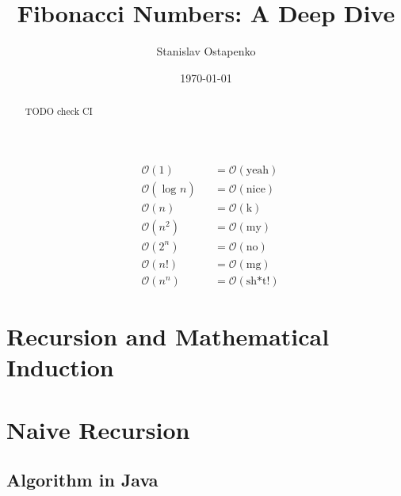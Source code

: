 \documentclass{article}
\begin{document}


\title{Fibonacci Numbers: A Deep Dive}
\author{Stanislav Ostapenko}
\date{\today}
\maketitle

\begin{abstract}
	TODO check CI
\end{abstract}

\clearpage

	\tableofcontents %

	\clearpage
	
	\lstlistoflistings %

\clearpage %

\clearpage

	\thispagestyle{empty}

	\vspace*{\fill}
	\begin{center}
		\Huge
		\begin{align*}
			&   \mathcal{O}(1) &&= \mathcal{O}(\text{yeah})\\
			&    \mathcal{O}(\log_{} n) &&= \mathcal{O}(\text{nice})\\
			&    \mathcal{O}(n) &&= \mathcal{O}(\text{k})\\
			&    \mathcal{O}(n^{2}) &&= \mathcal{O}(\text{my})\\
			&    \mathcal{O}(2^{n}) &&= \mathcal{O}(\text{no})\\
			&    \mathcal{O}(n!) &&= \mathcal{O}(\text{mg})\\
			&    \mathcal{O}(n^{n}) &&= \mathcal{O}(\text{sh*t!})
		\end{align*}
	\end{center}
	\vspace*{\fill}

\clearpage

\section{Recursion and Mathematical Induction}
\section{Naive Recursion}
\subsection{Algorithm in Java}
\end{document}
